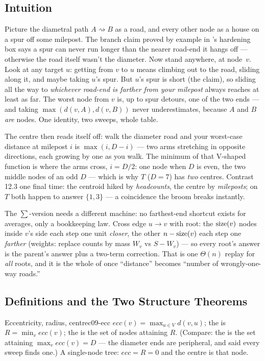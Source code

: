 \subsection{Intuition}

Picture the diametral path $A \rightsquigarrow B$ as a road, and every other node as a
house on a spur off some milepost. The branch claim proved by example in
's hardening box says a spur can never run longer than the nearer
road-end it hangs off --- otherwise the road itself wasn't the diameter. Now stand
anywhere, at node~$v$. Look at any target $u$: getting from $v$ to $u$ means climbing
out to the road, sliding along it, and maybe taking $u$'s spur. But $u$'s spur is short
(the claim), so sliding all the way to \emph{whichever road-end is farther from your
milepost} always reaches at least as far. The worst node from $v$ is, up to spur
detours, one of the two ends --- and taking $\max(d(v,A), d(v,B))$ never underestimates,
because $A$ and $B$ \emph{are} nodes. One identity, two sweeps, whole table.

The centre then reads itself off: walk the diameter road and your worst-case distance
at milepost $i$ is $\max(i, D-i)$ --- two arms stretching in opposite directions, each
growing by one as you walk. The minimum of that V-shaped function is where the arms
cross, $i = D/2$: one node when $D$ is even, the two middle nodes of an odd $D$ ---
which is why $T$ ($D=7$) has \emph{two} centres. Contrast 12.3 one final time: the
centroid hiked by \emph{headcounts}, the centre by \emph{mileposts}; on $T$ both
happen to answer $\{1,3\}$ --- a coincidence the broom breaks instantly.

The $\sum$-version needs a different machine: no farthest-end shortcut exists for
averages, only a bookkeeping law. Cross edge $u \to v$ with root: the $\operatorname{size}(v)$ nodes
inside $v$'s side each step one unit \emph{closer}, the other $n - \operatorname{size}(v)$ each step
one \emph{farther} (weights: replace counts by mass $W_v$ vs $S - W_v$) --- so every
root's answer is the parent's answer plus a two-term correction. That is one
$\Theta(n)$ replay for \emph{all} roots, and it is the whole of 
once ``distance'' becomes ``number of wrongly-one-way roads.''

\subsection{Definitions and the Two Structure Theorems}

\begin{definition}{Eccentricity, radius, centre}{c09-ecc}
$\mathit{ecc}(v) = \max_{u \in V} d(v, u)$; the  is
$R = \min_v \mathit{ecc}(v)$; the  is the set of nodes attaining $R$.
(Compare: the  is the set attaining $\max_v \mathit{ecc}(v) = D$ ---
the diameter ends are peripheral, and  said every sweep finds one.)
A single-node tree: $\mathit{ecc} = R = 0$ and the centre is that node.
\end{definition}

